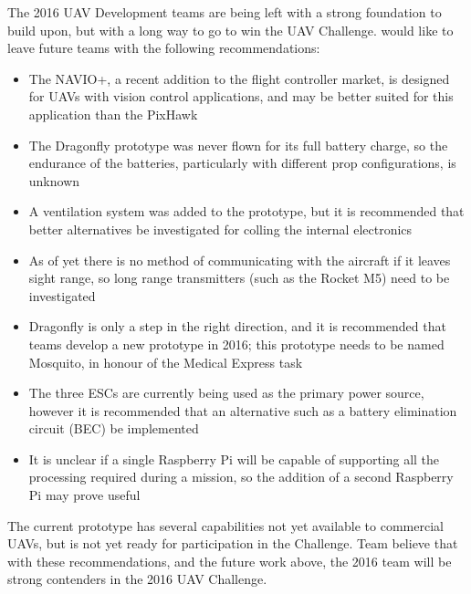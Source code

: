 The 2016 UAV Development teams are being left with a strong foundation to build upon, but with a long way to go to win the UAV Challenge. \ID would like to leave future teams with the following recommendations:

\begin{itemize}
	\item The NAVIO+\cite{ref:navio}, a recent addition to the flight controller market, is designed for UAVs with vision control applications, and may be better suited for this application than the PixHawk
	\item The Dragonfly prototype was never flown for its full battery charge, so the endurance of the batteries, particularly with different prop configurations, is unknown
	\item A ventilation system was added to the prototype, but it is recommended that better alternatives be investigated for colling the internal electronics
	\item As of yet there is no method of communicating with the aircraft if it leaves sight range, so long range transmitters (such as the Rocket M5) need to be investigated
	\item Dragonfly is only a step in the right direction, and it is recommended that teams develop a new prototype in 2016; this prototype needs to be named Mosquito, in honour of the Medical Express task
	\item The three ESCs are currently being used as the primary power source, however it is recommended that an alternative such as a battery elimination circuit (BEC) be implemented
	\item It is unclear if a single Raspberry Pi will be capable of supporting all the processing required during a mission, so the addition of a second Raspberry Pi may prove useful
\end{itemize}

The current prototype has several capabilities not yet available to commercial UAVs, but is not yet ready for participation in the Challenge. Team \ID believe that with these recommendations, and the future work above, the 2016 team will be strong contenders in the 2016 UAV Challenge.